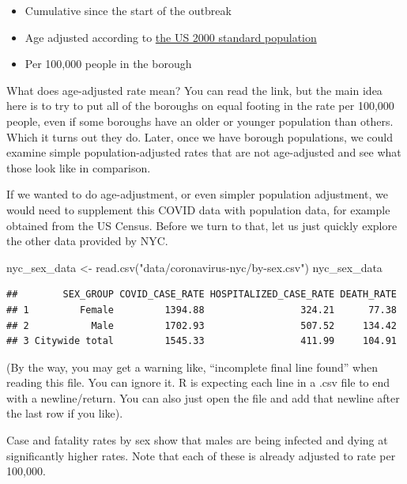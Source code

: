 \documentclass[
  openany]{book}
\newenvironment{Shaded}{\begin{snugshade}}{\end{snugshade}}
\newcommand{\FunctionTok}[1]{\textcolor[rgb]{0.00,0.00,0.00}{#1}}
\newcommand{\NormalTok}[1]{#1}
\newcommand{\OtherTok}[1]{\textcolor[rgb]{0.56,0.35,0.01}{#1}}
\newcommand{\StringTok}[1]{\textcolor[rgb]{0.31,0.60,0.02}{#1}}
\providecommand{\tightlist}{%
  \setlength{\itemsep}{0pt}\setlength{\parskip}{0pt}}
\begin{document}
\begin{itemize}
\tightlist
\item
  Cumulative since the start of the outbreak
\item
  Age adjusted according to \href{https://www.cdc.gov/nchs/data/statnt/statnt20.pdf}{the US 2000 standard population}
\item
  Per 100,000 people in the borough
\end{itemize}

What does age-adjusted rate mean? You can read the link, but the main idea here is to try to put all of the boroughs on equal footing in the rate per 100,000 people, even if some boroughs have an older or younger population than others. Which it turns out they do. Later, once we have borough populations, we could examine simple population-adjusted rates that are not age-adjusted and see what those look like in comparison.

If we wanted to do age-adjustment, or even simpler population adjustment, we would need to supplement this COVID data with population data, for example obtained from the US Census. Before we turn to that, let us just quickly explore the other data provided by NYC.

\begin{Shaded}
\begin{Highlighting}[]
\NormalTok{nyc\_sex\_data }\OtherTok{\textless{}{-}} \FunctionTok{read.csv}\NormalTok{(}\StringTok{"data/coronavirus{-}nyc/by{-}sex.csv"}\NormalTok{)}
\NormalTok{nyc\_sex\_data}
\end{Highlighting}
\end{Shaded}

\begin{verbatim}
##        SEX_GROUP COVID_CASE_RATE HOSPITALIZED_CASE_RATE DEATH_RATE
## 1         Female         1394.88                 324.21      77.38
## 2           Male         1702.93                 507.52     134.42
## 3 Citywide total         1545.33                 411.99     104.91
\end{verbatim}

(By the way, you may get a warning like, ``incomplete final line found'' when reading this file. You can ignore it. R is expecting each line in a .csv file to end with a newline/return. You can also just open the file and add that newline after the last row if you like).

Case and fatality rates by sex show that males are being infected and dying at significantly higher rates. Note that each of these is already adjusted to rate per 100,000.
\end{document}

